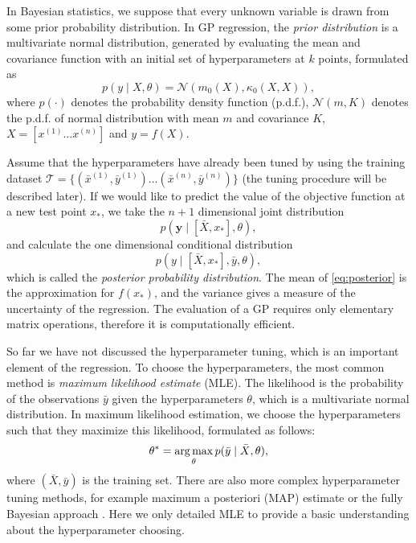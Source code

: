 In Bayesian statistics, we suppose that every unknown variable is drawn from some prior probability distribution. In GP regression, the \textit{prior distribution} is a multivariate normal distribution, generated by evaluating the mean and covariance function with an initial set of hyperparameters at $k$ points, formulated as
\begin{equation}\label{eq:prior}
   p(y\mid X, \theta) = \mathcal{N}(m_0(X),\kappa_0(X,X)),
\end{equation}
where $p(\cdot)$ denotes the probability density function (p.d.f.), $\mathcal{N}(m,K)$ denotes the p.d.f. of normal distribution with mean $m$ and covariance $K$, $X=[x^{(1)}\dots x^{(n)}]$ and $y=f(X)$.

Assume that the hyperparameters have already been tuned by using the training dataset $\mathcal{T} = \{(\bar x^{(1)}, \bar y^{(1)})\dots (\bar x^{(n)},\bar y^{(n)})\}$ (the tuning procedure will be described later). If we would like to predict %
the value of the objective function at a new test point $x_*$, we take the $n+1$ dimensional joint distribution $$p(\mathbf{y} \mid [\bar X,x_*],\theta),$$ and calculate the one dimensional conditional distribution 
\begin{equation}\label{eq:posterior}
    p(y\mid [\bar X,x_*],\bar y,\theta ),
\end{equation}
 which is called the \textit{posterior probability distribution}. The mean of \eqref{eq:posterior} is the approximation for $f(x_*)$, and the variance gives a measure of the uncertainty of the regression. The evaluation of a GP requires only elementary matrix operations, therefore it is computationally efficient. 

So far we have not discussed the hyperparameter tuning, which is an important element of the regression. To choose the hyperparameters, the most common method is \textit{maximum likelihood estimate} (MLE). The likelihood is the probability of the observations $\bar{y}$ given the hyperparameters $\theta$, which is a multivariate normal distribution. In maximum likelihood estimation, we choose the hyperparameters such that they maximize this likelihood, formulated as follows:
\begin{equation}
    \theta^* = \operatorname*{arg\,max}_\theta p(\bar y \mid \bar X, \theta),  
\end{equation}
where $ (\bar X, \bar y) $ is the training set. There are also more complex hyperparameter tuning methods, for example maximum a posteriori (MAP) estimate or the fully Bayesian approach \cite{RW2006}. Here we only detailed MLE to provide a basic understanding about the hyperparameter choosing.


